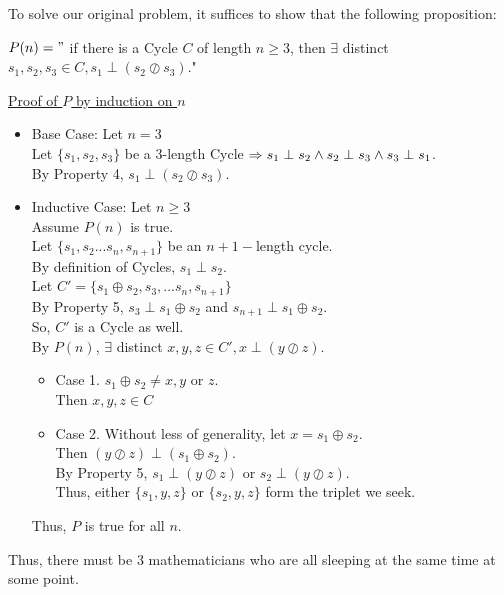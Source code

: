 \documentclass[fleqn]{article}
\newcommand{\set}[1]{\lbrace #1 \rbrace}
\newcommand{\iunion}{\oplus}
\newcommand{\iinter}{\oslash}
\newcommand{\ioverlap}{\perp}
\begin{document}
To solve our original problem, it suffices to show that the following proposition:

$P(n)="$ if there is a Cycle $C$ of length $n \geq 3$, then $\exists$ distinct $s_1, s_2, s_3 \in C, s_1 \ioverlap (s_2 \iinter s_3)$."

\underline{Proof of $P$ by induction on $n$}
\begin{itemize}
  \item Base Case: Let $n = 3$\\
        Let $\set{s_1,s_2,s_3}$ be a 3-length Cycle $\Rightarrow\\
        s_1 \ioverlap s_2 \wedge s_2 \ioverlap s_3 \wedge s_3 \ioverlap s_1$.\\
        By Property 4, $s_1 \ioverlap (s_2 \iinter s_3)$.
  \item Inductive Case: Let $n \geq 3$\\
        Assume $P(n)$ is true.\\
        Let $\set{s_1,s_2...s_n,s_{n+1}}$ be an $n+1-$length cycle.\\
        By definition of Cycles, $s_1 \ioverlap s_2$.\\
        Let $C' = \set{s_1 \iunion s_2, s_3,...s_n, s_{n+1}}$\\
        By Property 5, $s_3 \ioverlap s_1 \iunion s_2$ and 
                       $s_{n+1} \ioverlap s_1 \iunion s_2$.\\
        So, $C'$ is a Cycle as well.\\
        By $P(n)$, $\exists$ distinct $x,y,z \in C', x \ioverlap (y \iinter z)$.

        \begin{itemize}
          \item Case 1. $s_1 \iunion s_2 \not= x,y $ or $z$. \\
                Then $x,y,z \in C$
          \item Case 2. Without less of generality, let 
                $x = s_1 \iunion s_2$.\\
                Then $(y \iinter z) \ioverlap (s_1 \iunion s_2)$.\\
                By Property 5, $s_1 \ioverlap (y \iinter z)$ or
                               $s_2 \ioverlap (y \iinter z)$.\\
                Thus, either $\set{s_1,y,z}$ or $\set{s_2,y,z}$ form
                the triplet we seek.
        \end{itemize}
        
        Thus, $P$ is true for all $n$.
        
\end{itemize} 
       
Thus, there must be 3 mathematicians who are all sleeping at the same time at some point.
\end{document}
